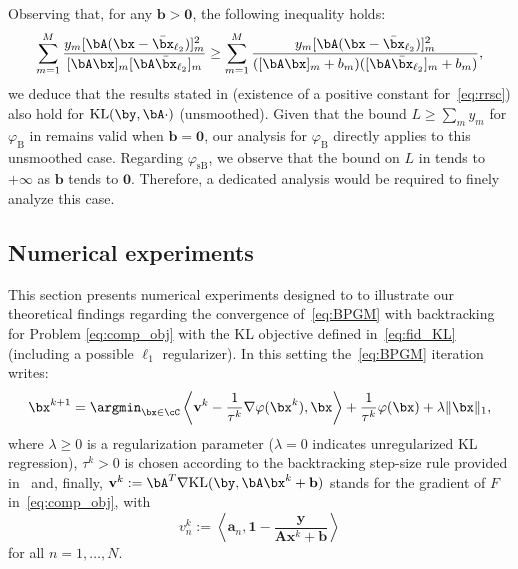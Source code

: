 \documentclass[11pt]{amsart}
\begin{document}
\begin{remark}[On the case $\mathbf{b} = \mathbf{0}$]
    Observing that, for any $\mathbf{b} > \mathbf{0}$, the following inequality holds:
$$
\sum_{m=1}^{M} \frac{y_{m}[\bA(\bx - \bar\bx_{\ell_2})]_m^2}{[\bA\bx]_m [\bA\bar\bx_{\ell_2}]_m}
\geq
\sum_{m=1}^{M} \frac{y_{m}[\bA(\bx - \bar\bx_{\ell_2})]_m^2}{([\bA\bx]_m + b_m)([\bA\bar\bx_{\ell_2}]_m + b_m)},
$$
we deduce that the results stated in  (existence of a positive constant for~\eqref{eq:rrsc}) also hold for $\mathrm{KL}(\by, \bA \cdot)$ (unsmoothed). Given that the bound $L \geq \sum_m y_m$ for $\varphi_{\mathrm{B}}$ in  remains valid when $\mathbf{b} = \mathbf{0}$, our analysis for $\varphi_{\mathrm{B}}$ directly applies to this unsmoothed case. Regarding $\varphi_{\mathrm{sB}}$, we observe that the bound on $L$ in  tends to $+\infty$ as $\mathbf{b}$ tends to $\mathbf{0}$. Therefore, a dedicated analysis would be required to finely analyze this case.
\end{remark}


\subsection{Numerical experiments}\label{sec:experiments}
This section presents numerical experiments designed to to illustrate our theoretical findings regarding the convergence of~\eqref{eq:BPGM} with backtracking for Problem \eqref{eq:comp_obj} with the KL objective defined in~\eqref{eq:fid_KL} (including a possible $\ell_1$ regularizer). In this setting the~\eqref{eq:BPGM} iteration writes:
\begin{equation} \label{eq: BPGM iter implicit}
\bx^{k+1} = \argmin_{\bx \in \cC} \left<\mathbf{v}^k-\frac{1}{\tau^k}\nabla\varphi(\bx^k), \bx\right> + \frac{1}{\tau^k} \varphi(\bx) +\lambda\|\bx\|_1,
\end{equation}
where $\lambda\geq 0$ is a regularization parameter ($\lambda=0$ indicates  unregularized KL regression), $\tau^k>0$ is chosen according to the backtracking step-size rule provided in~ and, finally, $\mathbf{v}^k:=\bA^T\nabla \mathrm{KL}(\by,\bA\bx^k+\mathbf{b})$ stands for the gradient of $F$ in~\cref{eq:comp_obj}, with 
\begin{equation}
    v_n^k := \left\langle \mathbf{a}_n, \mathbf{1} - \frac{\mathbf{y}}{\mathbf{A}\mathbf{x}^k + \mathbf{b}} \right\rangle \label{eq: gradient of KL}
\end{equation}
for all $n=1,\ldots, N$.
\end{document}
